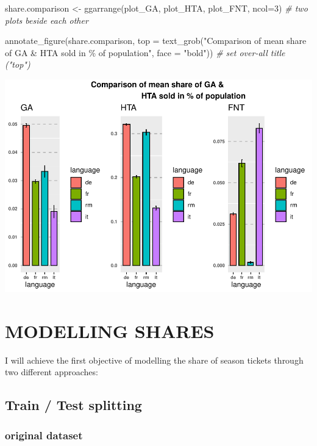 \documentclass[
]{article}
\newenvironment{Shaded}{\begin{snugshade}}{\end{snugshade}}
\newcommand{\AttributeTok}[1]{\textcolor[rgb]{0.77,0.63,0.00}{#1}}
\newcommand{\CommentTok}[1]{\textcolor[rgb]{0.56,0.35,0.01}{\textit{#1}}}
\newcommand{\DecValTok}[1]{\textcolor[rgb]{0.00,0.00,0.81}{#1}}
\newcommand{\FunctionTok}[1]{\textcolor[rgb]{0.00,0.00,0.00}{#1}}
\newcommand{\NormalTok}[1]{#1}
\newcommand{\OtherTok}[1]{\textcolor[rgb]{0.56,0.35,0.01}{#1}}
\newcommand{\StringTok}[1]{\textcolor[rgb]{0.31,0.60,0.02}{#1}}
\begin{document}
\begin{Shaded}
\begin{Highlighting}[]
\NormalTok{share.comparison }\OtherTok{\textless{}{-}} \FunctionTok{ggarrange}\NormalTok{(plot\_GA, plot\_HTA, plot\_FNT, }\AttributeTok{ncol=}\DecValTok{3}\NormalTok{) }\CommentTok{\# two plots beside each other}

\FunctionTok{annotate\_figure}\NormalTok{(share.comparison, }
                \AttributeTok{top =} \FunctionTok{text\_grob}\NormalTok{(}\StringTok{"Comparison of mean share of GA \& }
\StringTok{                                HTA sold in \% of population"}\NormalTok{, }
                                \AttributeTok{face =} \StringTok{"bold"}\NormalTok{)) }\CommentTok{\# set over{-}all title ("top")}
\end{Highlighting}
\end{Shaded}

\includegraphics{Lin_Mod_Clus_Analysis_files/figure-latex/unnamed-chunk-17-1.pdf}

\newpage

\hypertarget{modelling-shares}{%
\section{MODELLING SHARES}\label{modelling-shares}}

I will achieve the first objective of modelling the share of season
tickets through two different approaches:

\hypertarget{train-test-splitting}{%
\subsection{Train / Test splitting}\label{train-test-splitting}}

\hypertarget{original-dataset}{%
\subsubsection{original dataset}\label{original-dataset}}
\end{document}
